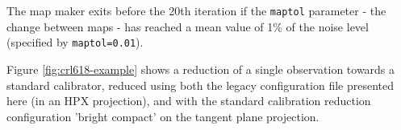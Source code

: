 \documentclass[usenatbib]{mnras}
\newcommand{\note}[1]{\textcolor{red}{Note: #1}}
\begin{document}
The map maker exits before the 20th iteration if the \texttt{maptol}
parameter - the change between maps - has reached a mean value of 1\%
of the noise level (specified by \texttt{maptol=0.01}).






Figure \ref{fig:crl618-example} shows a reduction of a single
observation towards a standard calibrator, reduced using both the
legacy configuration file presented here (in an HPX projection), and
with the standard calibration reduction configuration 'bright compact'
on the tangent plane projection.
\end{document}
